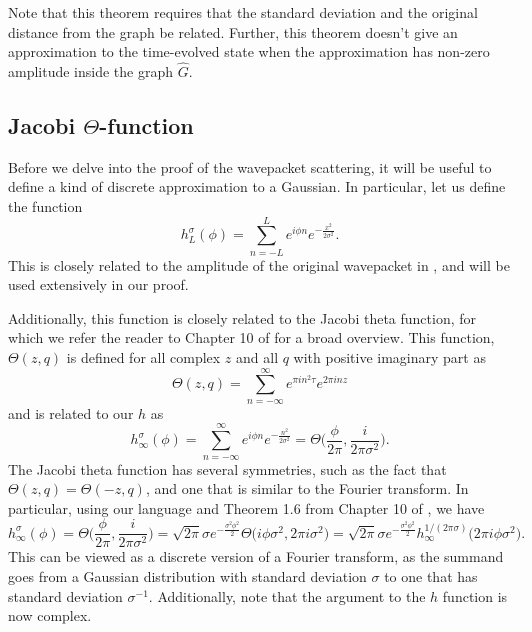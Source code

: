 \documentclass[../thesis-main/thesis-main]{subfiles}
\begin{document}
Note that this theorem requires that the standard deviation and the original distance from the graph be related.  Further, this theorem doesn't give an approximation to the time-evolved state when the approximation has non-zero amplitude inside the graph $\widehat{G}$.


\subsection{Jacobi $\Theta$-function}

Before we delve into the proof of the wavepacket scattering, it will be useful to define a kind of discrete approximation to a Gaussian.  In particular, let us define the function
\begin{equation}
  h_L^\sigma(\phi) = \sum_{n = -L}^L e^{i \phi n} e^{-\frac{ x^2}{2\sigma^2}}. 
  \label{eq:h_L_defn}
\end{equation}
This is closely related to the amplitude of the original wavepacket in , and will be used extensively in our proof.

Additionally, this function is closely related to the Jacobi theta function, for which we refer the reader to Chapter 10 of \cite{SSCA} for a broad overview.  This function, $\Theta(z,q)$ is defined for all complex $z$ and all $q$ with positive imaginary part as
\begin{equation}
  \Theta(z,q) = \sum_{n = -\infty}^\infty e^{ \pi i n^2 \tau} e^{ 2\pi  i n z}
\end{equation}
 and is related to our $h$ as 
\begin{equation}
  h_{\infty}^\sigma(\phi) = \sum_{n = -\infty}^\infty e^{ i \phi n} e^{ - \frac{ n^2}{2\sigma^2}} = \Theta\Bigg(\frac{\phi}{2\pi}, \frac{i}{2\pi \sigma^2} \Bigg).
\end{equation}
The Jacobi theta function has several symmetries, such as the fact that $\Theta(z,q) = \Theta(-z, q)$, and one that is similar to the Fourier transform.  In particular, using our language and Theorem 1.6 from Chapter 10 of \cite{SSCA}, we have
\begin{equation}
  h_{\infty}^\sigma (\phi) = \Theta\Bigg(\frac{\phi}{2\pi}, \frac{i}{2\pi \sigma^2} \Bigg) = \sqrt{2\pi} \sigma e^{ - \frac{\sigma^2\phi^2}{2}} \Theta \big(i \phi\sigma^2, 2\pi i \sigma^2 \big) =  \sqrt{2\pi} \sigma e^{ - \frac{\sigma^2\phi^2}{2}}  h_{\infty}^{1/(2\pi \sigma)}\big(2\pi i \phi \sigma^2 \big).
  \label{eq:discrete_fourier_transform}
\end{equation}
This can be viewed as a discrete version of a Fourier transform, as the summand goes from a Gaussian distribution with standard deviation $\sigma$ to one that has standard deviation $\sigma^{-1}$.  Additionally, note that the argument to the $h$ function is now complex.
\end{document}
